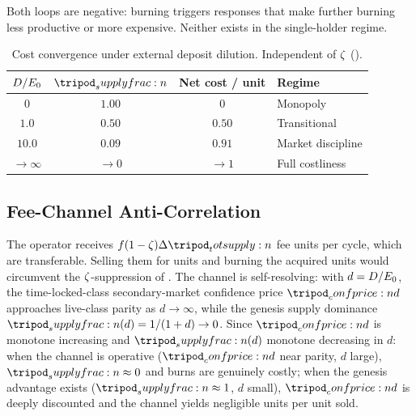 \documentclass[../main.tex]{subfiles}
\begin{document}
Both loops are negative: burning triggers responses that make further burning less
productive or more expensive. Neither exists in the single-holder regime.

\begin{table}[h!]
    \centering
    \caption{Cost convergence under external deposit dilution. Independent of $\zeta$
    ().}
    \label{tab:discipline:cost-convergence}
    \begin{tabular}{@{}c c c l@{}}
        \toprule
        $D/E\sb{0}$ & $\supplyfrac{}$ & Net cost / unit & \textbf{Regime} \\
        \midrule
        $0$         & $1.00$    & $0$    & Monopoly \\
        $1.0$       & $0.50$    & $0.50$ & Transitional \\
        $10.0$      & $0.09$    & $0.91$ & Market discipline \\
        $\to\infty$ & $\to 0$   & $\to 1$ & Full costliness \\
        \bottomrule
    \end{tabular}
\end{table}

\subsection{Fee-Channel Anti-Correlation}
\label{sec:discipline:anti-correlation}

\begin{proposition}
    \label{prop:discipline:anti-correlation}
    The operator receives $\feerate(1-\livesplit)\Delta\totsupply{}$ fee \tlockclass{} units
    per cycle, which are transferable. Selling them for \liveclass{} units and burning the
    acquired units would circumvent the $\zeta$-suppression of
    . The channel is self-resolving: with
    $d = D/E\sb{0}$, the time-locked-class secondary-market confidence price
    $\confprice{d}$ approaches live-class parity as $d \to \infty$, while the genesis supply
    dominance $\supplyfrac{}(d) = 1/(1+d) \to 0$. Since $\confprice{d}$ is monotone
    increasing and $\supplyfrac{}(d)$ monotone decreasing in $d$: when the channel is
    operative ($\confprice{d}$ near parity, $d$ large), $\supplyfrac{} \approx 0$ and burns
    are genuinely costly; when the genesis advantage exists ($\supplyfrac{} \approx 1$, $d$
    small), $\confprice{d}$ is deeply discounted and the channel yields negligible
    \liveclass{} units per \tlockclass{} unit sold.
\end{proposition}
\end{document}
